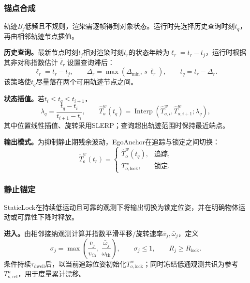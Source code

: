 \documentclass[review]{vgtc}
\begin{document}
\subsubsection{锚点合成}\label{sec:frame-output}

轨迹$B_j$低频且不规则，渲染需逐帧得到对象状态。运行时先选择历史查询时刻$t_q$，再由相邻轨迹节点插值。

\textbf{历史查询。}最新节点时刻$t_j$相对渲染时刻$t_r$的状态年龄为$\ell_r=t_r-t_j$，运行时根据其非对称指数估计$\bar{\ell}_r$设置查询滞后：
\begin{equation}
\ell_r = t_r - t_j, \qquad \Delta_r = \max(\Delta_{\min},\, s\,\bar{\ell}_r), \qquad t_q = t_r - \Delta_r.
\label{eq:target-time}
\end{equation}
该策略使$t_q$尽量落在两个可用轨迹节点之间。

\textbf{状态插值。}若$t_i\leq t_q\leq t_{i+1}$，
\begin{equation}
\lambda_q = \frac{t_q - t_i}{t_{i+1} - t_i}, \qquad \widehat{T}_o^w(t_q) = \operatorname{Interp}(\widehat{T}_{o,i}^{w}, \widehat{T}_{o,i+1}^{w}; \lambda_q),
\label{eq:history-interp}
\end{equation}
其中位置线性插值、旋转采用SLERP；查询超出轨迹范围时保持最近端点。

\textbf{输出模式。}为抑制静止期残余波动，EgoAnchor在追踪与锁定之间切换：
\begin{equation}
\widetilde{T}_o^w(t_r) = \begin{cases}
\widehat{T}_o^w(t_q), & \text{追踪}, \\
T_{o,\mathrm{lock}}^w, & \text{锁定}.
\end{cases}
\label{eq:staticlock}
\end{equation}

\subsubsection{静止锚定}\label{sec:staticlock}

StaticLock在持续低运动且可靠的观测下将输出切换为锁定位姿，并在明确物体运动或可靠性下降时释放。

\textbf{进入。}由相邻接纳观测计算并指数平滑平移/旋转速率$\bar v_j,\bar\omega_j$，定义
\begin{equation}
\sigma_j = \max\left(\frac{\bar{v}_j}{v_{\mathrm{th}}},\ \frac{\bar{\omega}_j}{\omega_{\mathrm{th}}}\right), \qquad \sigma_j \leq 1, \qquad R_j \geq R_{\mathrm{lock}}.
\label{eq:lock-entry}
\end{equation}
条件持续$\tau_{\mathrm{dwell}}$后，以当前追踪位姿初始化$T_{o,\mathrm{lock}}^w$；同时冻结低通观测共识为参考$T_{o,\mathrm{ref}}^w$，用于度量累计漂移。
\end{document}
